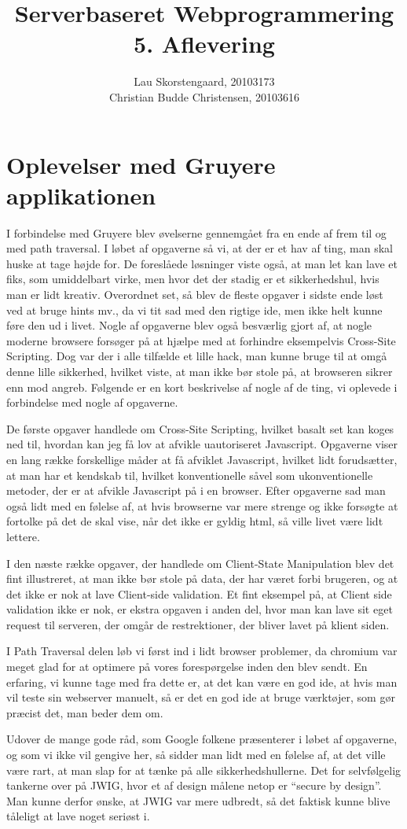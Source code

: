 \documentclass[a4paper,10pt]{article}
\author{Lau Skorstengaard, 20103173 \\Christian Budde Christensen, 20103616}
\title{Serverbaseret Webprogrammering\\5. Aflevering}
\begin{document}
\maketitle
\section*{Oplevelser med Gruyere applikationen}
I forbindelse med Gruyere blev øvelserne gennemgået fra en ende af frem til og med path traversal. I løbet af opgaverne så vi, at der er et hav af ting, man skal huske at tage højde for. De foreslåede løsninger viste også, at man let kan lave et fiks, som umiddelbart virke, men hvor det der stadig er et sikkerhedshul, hvis man er lidt kreativ. Overordnet set, så blev de fleste opgaver i sidste ende løst ved at bruge hints mv., da vi tit sad med den rigtige ide, men ikke helt kunne føre den ud i livet. Nogle af opgaverne blev også besværlig gjort af, at nogle moderne browsere forsøger på at hjælpe med at forhindre eksempelvis Cross-Site Scripting. Dog var der i alle tilfælde et lille hack, man kunne bruge til at omgå denne lille sikkerhed, hvilket viste, at man ikke bør stole på, at browseren sikrer enn mod angreb. Følgende er en kort beskrivelse af nogle af de ting, vi oplevede i forbindelse med nogle af opgaverne.

De første opgaver handlede om Cross-Site Scripting, hvilket basalt set kan koges ned til, hvordan kan jeg få lov at afvikle uautoriseret Javascript. Opgaverne viser en lang række forskellige måder at få afviklet Javascript, hvilket lidt forudsætter, at man har et kendskab til, hvilket konventionelle såvel som ukonventionelle metoder, der er at afvikle Javascript på i en browser. Efter opgaverne sad man også lidt med en følelse af, at hvis browserne var mere strenge og ikke forsøgte at fortolke på det de skal vise, når det ikke er gyldig html, så ville livet være lidt lettere.

I den næste række opgaver, der handlede om Client-State Manipulation blev det fint illustreret, at man ikke bør stole på data, der har været forbi brugeren, og at det ikke er nok at lave Client-side validation. Et fint eksempel på, at Client side validation ikke er nok, er ekstra opgaven i anden del, hvor man kan lave sit eget request til serveren, der omgår de restrektioner, der bliver lavet på klient siden. 

I Path Traversal delen løb vi først ind i lidt browser problemer, da chromium var meget glad for at optimere på vores forespørgelse inden den blev sendt. En erfaring, vi kunne tage med fra dette er, at det kan være en god ide, at hvis man vil teste sin webserver manuelt, så er det en god ide at bruge værktøjer, som gør præcist det, man beder dem om.

Udover de mange gode råd, som Google folkene præsenterer i løbet af opgaverne, og som vi ikke vil gengive her, så sidder man lidt med en følelse af, at det ville være rart, at man slap for at tænke på alle sikkerhedshullerne. Det for selvfølgelig tankerne over på JWIG, hvor et af design målene netop er ``secure by design''. Man kunne derfor ønske, at JWIG var mere udbredt, så det faktisk kunne blive tåleligt at lave noget seriøst i.

 
\end{document}

